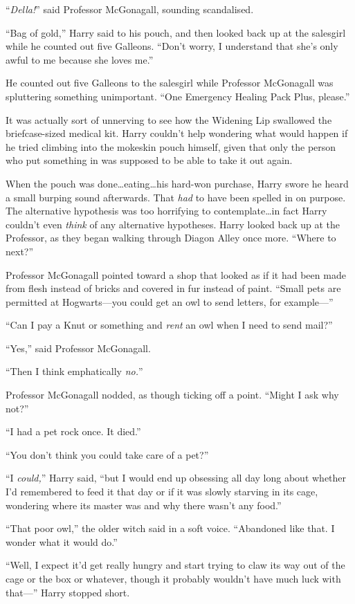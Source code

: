 “\emph{Della!}” said Professor McGonagall, sounding scandalised.

“Bag of gold,” Harry said to his pouch, and then looked back up at the salesgirl while he counted out five Galleons. “Don’t worry, I understand that she’s only awful to me because she loves me.”

He counted out five Galleons to the salesgirl while Professor McGonagall was spluttering something unimportant. “One Emergency Healing Pack Plus, please.”

It was actually sort of unnerving to see how the Widening Lip swallowed the briefcase-sized medical kit. Harry couldn’t help wondering what would happen if he tried climbing into the mokeskin pouch himself, given that only the person who put something in was supposed to be able to take it out again.

When the pouch was done…eating…his hard-won purchase, Harry
swore he heard a small burping sound afterwards. That \emph{had} to have been spelled in on purpose. The alternative hypothesis was too horrifying to contemplate…in fact Harry couldn’t even \emph{think} of any alternative hypotheses. Harry looked back up at the Professor, as they began walking through Diagon Alley once more. “Where to next?”

Professor McGonagall pointed toward a shop that looked as if it had been made from flesh instead of bricks and covered in fur instead of paint. “Small pets are permitted at Hogwarts—you could get an owl to send letters, for example—”

“Can I pay a Knut or something and \emph{rent} an owl when I need to send mail?”

“Yes,” said Professor McGonagall.

“Then I think emphatically \emph{no.}”

Professor McGonagall nodded, as though ticking off a point. “Might I ask why not?”

“I had a pet rock once. It died.”

“You don’t think you could take care of a pet?”

“I \emph{could,}” Harry said, “but I would end up obsessing all day long about whether I’d remembered to feed it that day or if it was slowly starving in its cage, wondering where its master was and why there wasn’t any food.”

“That poor owl,” the older witch said in a soft voice. “Abandoned like that. I wonder what it would do.”

“Well, I expect it’d get really hungry and start trying to claw its way out of the cage or the box or whatever, though it probably wouldn’t have much luck with that—” Harry stopped short.

